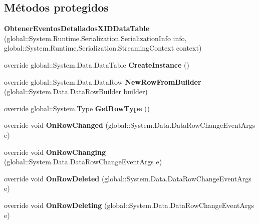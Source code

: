 \subsection*{Métodos protegidos}
\begin{DoxyCompactItemize}
\item 
{\bfseries Obtener\+Eventos\+Detallados\+X\+I\+D\+Data\+Table} (global\+::\+System.\+Runtime.\+Serialization.\+Serialization\+Info info, global\+::\+System.\+Runtime.\+Serialization.\+Streaming\+Context context)\label{class_resa___pro_1_1_resa_d_b_data_set_1_1_obtener_eventos_detallados_x_i_d_data_table_a0df56553d5fd00f16a981c4eaa9b4ba7}

\item 
override global\+::\+System.\+Data.\+Data\+Table {\bfseries Create\+Instance} ()\label{class_resa___pro_1_1_resa_d_b_data_set_1_1_obtener_eventos_detallados_x_i_d_data_table_a26fe1bb2fd27ea73e053955f42de6632}

\item 
override global\+::\+System.\+Data.\+Data\+Row {\bfseries New\+Row\+From\+Builder} (global\+::\+System.\+Data.\+Data\+Row\+Builder builder)\label{class_resa___pro_1_1_resa_d_b_data_set_1_1_obtener_eventos_detallados_x_i_d_data_table_aad6ea1ec7b4484f87d1c926125b4b524}

\item 
override global\+::\+System.\+Type {\bfseries Get\+Row\+Type} ()\label{class_resa___pro_1_1_resa_d_b_data_set_1_1_obtener_eventos_detallados_x_i_d_data_table_a4da8a0f9bd6990749cbcb5c41ab2ce70}

\item 
override void {\bfseries On\+Row\+Changed} (global\+::\+System.\+Data.\+Data\+Row\+Change\+Event\+Args e)\label{class_resa___pro_1_1_resa_d_b_data_set_1_1_obtener_eventos_detallados_x_i_d_data_table_a5b34db41b3ca48748cb44b2f905071fc}

\item 
override void {\bfseries On\+Row\+Changing} (global\+::\+System.\+Data.\+Data\+Row\+Change\+Event\+Args e)\label{class_resa___pro_1_1_resa_d_b_data_set_1_1_obtener_eventos_detallados_x_i_d_data_table_a06ee03b8f53504ded671aa0d63ded939}

\item 
override void {\bfseries On\+Row\+Deleted} (global\+::\+System.\+Data.\+Data\+Row\+Change\+Event\+Args e)\label{class_resa___pro_1_1_resa_d_b_data_set_1_1_obtener_eventos_detallados_x_i_d_data_table_ae34f8ac0cfc3376985072e52a9e36331}

\item 
override void {\bfseries On\+Row\+Deleting} (global\+::\+System.\+Data.\+Data\+Row\+Change\+Event\+Args e)\label{class_resa___pro_1_1_resa_d_b_data_set_1_1_obtener_eventos_detallados_x_i_d_data_table_a8f20201833cb776cc83c44fdf81673f0}


\end{DoxyCompactItemize}
